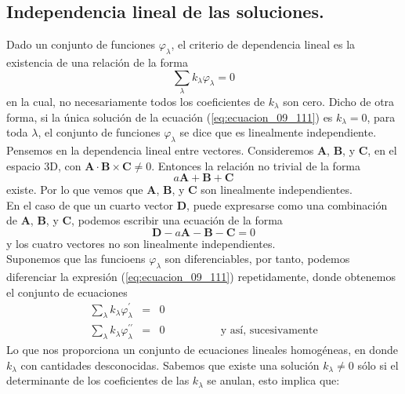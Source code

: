 \subsection{Independencia lineal de las soluciones.}
Dado  un conjunto de funciones $\varphi_{\lambda}$, el criterio de dependencia lineal es la existencia de una relación de la forma
\begin{equation}
\sum_{\lambda} k_{\lambda} \varphi_{\lambda} = 0 
\label{eq:ecuacion_09_111}
\end{equation}
en la cual, no necesariamente todos los coeficientes de $k_{\lambda}$ son cero. Dicho de otra forma, si la única solución de la ecuación (\ref{eq:ecuacion_09_111}) es $k_{\lambda} = 0$, para toda $\lambda$, el conjunto de funciones $\varphi_{\lambda}$ se dice que es linealmente independiente.
\\
Pensemos en la dependencia lineal entre vectores. Consideremos $\mathbf{A}$, $\mathbf{B}$, y $\mathbf{C}$, en el espacio 3D, con $\mathbf{A} \cdot \mathbf{B} \times \mathbf{C} \neq 0$. Entonces la relación no trivial de la forma
\begin{equation}
a \mathbf{A} + \textbf{B} + \mathbf{C}
\label{eq:ecuacion_09_112}
\end{equation}
existe. Por lo que vemos que $\mathbf{A}$, $\mathbf{B}$, y $\mathbf{C}$ son linealmente independientes.
\\
En el caso de que un cuarto vector $\mathbf{D}$, puede expresarse como una combinación de $\mathbf{A}$, $\mathbf{B}$, y $\mathbf{C}$, podemos escribir una ecuación de la forma
\begin{equation}
\mathbf{D} -  a \mathbf{A} - \textbf{B} - \mathbf{C} = 0
\label{eq:ecuacion_09_113}
\end{equation}
y los cuatro vectores no son linealmente independientes.
\\
Suponemos que las funcioens $\varphi_{\lambda}$ son diferenciables, por tanto, podemos diferenciar la expresión (\ref{eq:ecuacion_09_111}) repetidamente, donde obtenemos el conjunto de ecuaciones
\begin{eqnarray}
\sum_{\lambda} k_{\lambda} \varphi^{\prime}_{\lambda} &=& 0 \label{eq:ecuacion_09_114} \\
\sum_{\lambda} k_{\lambda} \varphi^{\prime \prime}_{\lambda} &=& 0 \hspace{2cm} \mbox{ y así, sucesivamente} \label{eq:ecuacion_09_115}
\end{eqnarray}
Lo que nos proporciona un conjunto de ecuaciones lineales homogéneas, en donde $k_{\lambda}$ con cantidades desconocidas. Sabemos que existe una solución $k_{\lambda} \neq 0$ sólo si el determinante de los coeficientes de las $k_{\lambda}$ se anulan, esto implica que:
